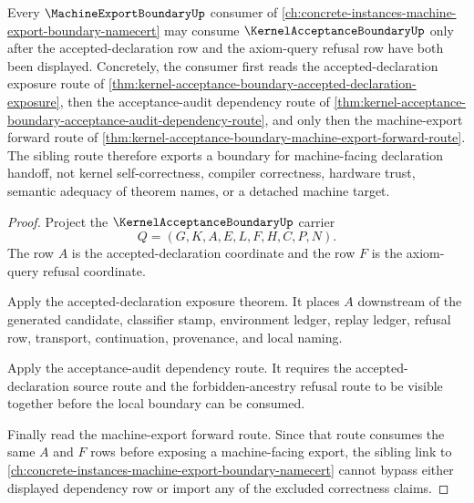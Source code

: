 \begin{lemma}
\label{lem:kernel-acceptance-boundary-machine-export-sibling-route}
Every $\MachineExportBoundaryUp$ consumer of \autoref{ch:concrete-instances-machine-export-boundary-namecert} may consume $\KernelAcceptanceBoundaryUp$ only after the accepted-declaration row and the axiom-query refusal row have both been displayed. Concretely, the consumer first reads the accepted-declaration exposure route of \autoref{thm:kernel-acceptance-boundary-accepted-declaration-exposure}, then the acceptance-audit dependency route of \autoref{thm:kernel-acceptance-boundary-acceptance-audit-dependency-route}, and only then the machine-export forward route of \autoref{thm:kernel-acceptance-boundary-machine-export-forward-route}. The sibling route therefore exports a boundary for machine-facing declaration handoff, not kernel self-correctness, compiler correctness, hardware trust, semantic adequacy of theorem names, or a detached machine target.
\end{lemma}
\begin{proof}
Project the $\KernelAcceptanceBoundaryUp$ carrier
$$
Q=(G,K,A,E,L,F,H,C,P,N).
$$
The row $A$ is the accepted-declaration coordinate and the row $F$ is the axiom-query refusal coordinate.

Apply the accepted-declaration exposure theorem. It places $A$ downstream of the generated candidate, classifier stamp, environment ledger, replay ledger, refusal row, transport, continuation, provenance, and local naming.

Apply the acceptance-audit dependency route. It requires the accepted-declaration source route and the forbidden-ancestry refusal route to be visible together before the local boundary can be consumed.

Finally read the machine-export forward route. Since that route consumes the same $A$ and $F$ rows before exposing a machine-facing export, the sibling link to \autoref{ch:concrete-instances-machine-export-boundary-namecert} cannot bypass either displayed dependency row or import any of the excluded correctness claims.
\end{proof}
